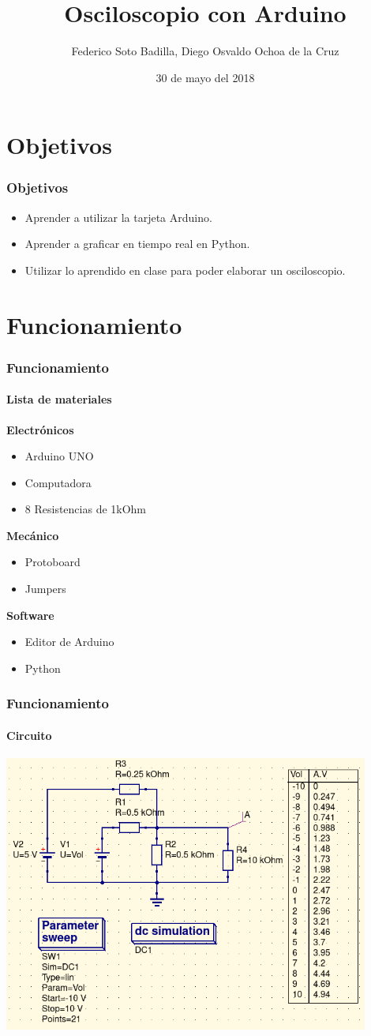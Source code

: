 \documentclass{beamer}
\author{Federico Soto Badilla, Diego Osvaldo Ochoa de la Cruz}
\title{Osciloscopio con Arduino}
\date{30 de mayo del 2018}
\begin{document}
\maketitle

\section{Objetivos}
\begin{frame}
\frametitle{Objetivos}
\begin{itemize}
\item Aprender a utilizar la tarjeta Arduino.
\item Aprender a graficar en tiempo real en Python.
\item Utilizar lo aprendido en clase para poder elaborar un osciloscopio.
\end{itemize}
\end{frame}

\section{Funcionamiento}
\begin{frame}
\frametitle{Funcionamiento}
\framesubtitle{Lista de materiales}
\noindent
\textbf{Electrónicos}
\begin{itemize}
\item Arduino UNO
\item Computadora
\item 8 Resistencias de 1kOhm
\end{itemize}
\textbf{Mecánico}
\begin{itemize}
\item Protoboard
\item Jumpers
\end{itemize}
\textbf{Software}
\begin{itemize}
\item Editor de Arduino
\item Python
\end{itemize}
\end{frame}

\begin{frame}
\frametitle{Funcionamiento}
\framesubtitle{Circuito}
\includegraphics[width=0.9\textwidth]{CirSim.png}
\end{frame}
\end{document}

